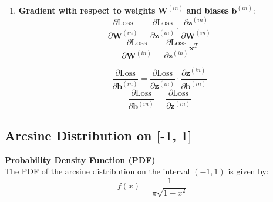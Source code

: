 \documentclass{ioereport}
\begin{document}
\begin{enumerate}[label=\textbf{\roman*.}]
  \item \textbf{Gradient with respect to weights} $\mathbf{W}^{(in)}$ \textbf{and biases} $\mathbf{b}^{(in)}$:
       \[
  \frac{\partial \text{Loss}}{\partial \mathbf{W}^{(in)}} = \frac{\partial \text{Loss}}{\partial \mathbf{z}^{(in)}} \cdot \frac{\partial \mathbf{z}^{(in)}}{\partial \mathbf{W}^{(in)}}
  \]
  \begin{equation}
  \frac{\partial \text{Loss}}{\partial \mathbf{W}^{(in)}} = \frac{\partial \text{Loss}}{\partial \mathbf{z}^{(in)}} \mathbf{x}^T
  \end{equation}

         \[
  \frac{\partial \text{Loss}}{\partial \mathbf{b}^{(in)}} = \frac{\partial \text{Loss}}{\partial \mathbf{z}^{(in)}} \cdot \frac{\partial \mathbf{z}^{(in)}}{\partial \mathbf{b}^{(in)}}
  \]
  \begin{equation}
  \frac{\partial \text{Loss}}{\partial \mathbf{b}^{(in)}} = \frac{\partial \text{Loss}}{\partial \mathbf{z}^{(in)}}
  \end{equation}
\end{enumerate}

\pagebreak


\setcounter{subsection}{2}
\subsection{Arcsine Distribution on [-1, 1]}
\label{app:arcsine-distribution}

\textbf{Probability Density Function (PDF)}\\
The PDF of the arcsine distribution on the interval \((-1, 1)\) is given by:
\begin{equation}
    f(x) = \frac{1}{\pi \sqrt{1-x^2}}
\end{equation}
\end{document}
